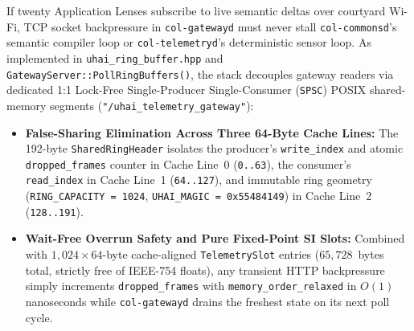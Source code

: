 If twenty Application Lenses subscribe to live semantic deltas over courtyard Wi-Fi, TCP socket
backpressure in \texttt{col-gatewayd} must never stall \texttt{col-commonsd}'s semantic compiler
loop or \texttt{col-telemetryd}'s deterministic sensor loop. As implemented in
\texttt{uhai\_ring\_buffer.hpp} and \texttt{GatewayServer::PollRingBuffers()}, the stack
decouples gateway readers via dedicated 1:1 Lock-Free Single-Producer Single-Consumer
(\texttt{SPSC}) POSIX shared-memory segments (\texttt{"/uhai\_telemetry\_gateway"}):
\begin{itemize}
\item \textbf{False-Sharing Elimination Across Three 64-Byte Cache Lines:} The 192-byte
      \texttt{SharedRingHeader} isolates the producer's \texttt{write\_index} and atomic
      \texttt{dropped\_frames} counter in Cache Line~0 (\texttt{0..63}), the consumer's
      \texttt{read\_index} in Cache Line~1 (\texttt{64..127}), and immutable ring geometry
      (\texttt{RING\_CAPACITY = 1024}, \texttt{UHAI\_MAGIC = 0x55484149}) in Cache Line~2
      (\texttt{128..191}).
\item \textbf{Wait-Free Overrun Safety and Pure Fixed-Point SI Slots:} Combined with
      $1{,}024 \times 64$-byte cache-aligned \texttt{TelemetrySlot} entries ($65{,}728$~bytes
      total, strictly free of IEEE-754 floats), any transient HTTP backpressure simply increments
      \texttt{dropped\_frames} with \texttt{memory\_order\_relaxed} in $O(1)$ nanoseconds while
      \texttt{col-gatewayd} drains the freshest state on its next poll cycle.
\end{itemize}

